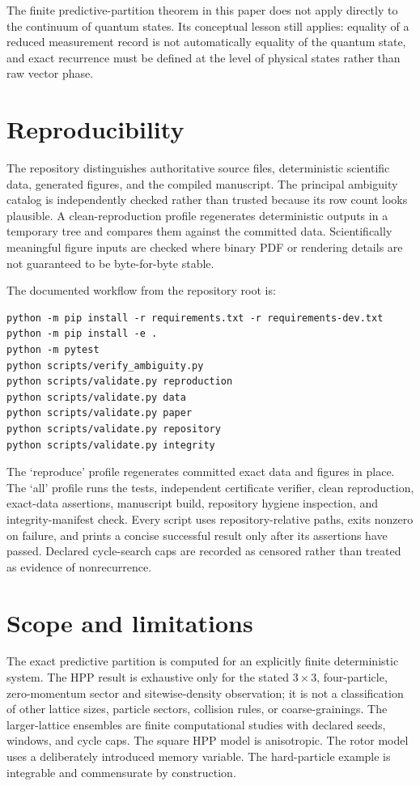 \documentclass[11pt]{article}
\begin{document}
The finite predictive-partition theorem in this paper does not apply directly to
the continuum of quantum states. Its conceptual lesson still applies: equality
of a reduced measurement record is not automatically equality of the quantum
state, and exact recurrence must be defined at the level of physical states rather
than raw vector phase.

\section{Reproducibility}

The repository distinguishes authoritative source files, deterministic scientific
data, generated figures, and the compiled manuscript. The principal ambiguity
catalog is independently checked rather than trusted because its row count looks
plausible. A clean-reproduction profile regenerates deterministic outputs in a
temporary tree and compares them against the committed data. Scientifically
meaningful figure inputs are checked where binary PDF or rendering details are
not guaranteed to be byte-for-byte stable.

The documented workflow from the repository root is:
\begin{verbatim}
python -m pip install -r requirements.txt -r requirements-dev.txt
python -m pip install -e .
python -m pytest
python scripts/verify_ambiguity.py
python scripts/validate.py reproduction
python scripts/validate.py data
python scripts/validate.py paper
python scripts/validate.py repository
python scripts/validate.py integrity
\end{verbatim}

The `reproduce' profile regenerates committed exact data and figures in place. The
`all' profile runs the tests, independent certificate verifier, clean reproduction,
exact-data assertions, manuscript build, repository hygiene inspection, and
integrity-manifest check. Every script uses repository-relative paths, exits
nonzero on failure, and prints a concise successful result only after its
assertions have passed. Declared cycle-search caps are recorded as censored rather
than treated as evidence of nonrecurrence.

\section{Scope and limitations}

The exact predictive partition is computed for an explicitly finite deterministic
system. The HPP result is exhaustive only for the stated $3\times3$,
four-particle, zero-momentum sector and sitewise-density observation; it is not a
classification of other lattice sizes, particle sectors, collision rules, or
coarse-grainings. The larger-lattice ensembles are finite computational studies
with declared seeds, windows, and cycle caps. The square HPP model is anisotropic.
The rotor model uses a deliberately introduced memory variable. The hard-particle
example is integrable and commensurate by construction.
\end{document}
